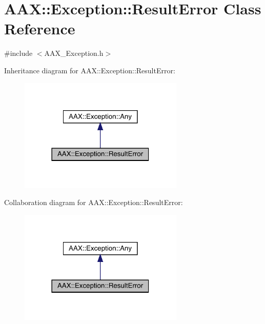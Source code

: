 \hypertarget{a01597}{}\section{A\+AX\+::Exception\+::Result\+Error Class Reference}
\label{a01597}


{\ttfamily \#include $<$A\+A\+X\+\_\+\+Exception.\+h$>$}



Inheritance diagram for A\+AX\+::Exception\+::Result\+Error\+:
\nopagebreak
\begin{figure}[H]
\begin{center}
\leavevmode
\includegraphics[width=222pt]{a01596}
\end{center}
\end{figure}


Collaboration diagram for A\+AX\+::Exception\+::Result\+Error\+:
\nopagebreak
\begin{figure}[H]
\begin{center}
\leavevmode
\includegraphics[width=222pt]{a01595}
\end{center}
\end{figure}


